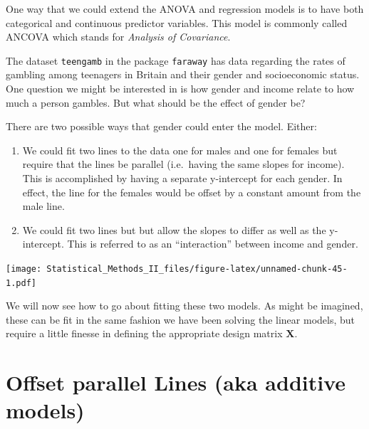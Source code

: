\documentclass[]{book}
\theoremstyle{definition}
\theoremstyle{definition}
\theoremstyle{remark}
\begin{document}
One way that we could extend the ANOVA and regression models is to have
both categorical and continuous predictor variables. This model is
commonly called ANCOVA which stands for \emph{Analysis of Covariance}.

The dataset \texttt{teengamb} in the package \texttt{faraway} has data
regarding the rates of gambling among teenagers in Britain and their
gender and socioeconomic status. One question we might be interested in
is how gender and income relate to how much a person gambles. But what
should be the effect of gender be?

There are two possible ways that gender could enter the model. Either:

\begin{enumerate}
\def\labelenumi{\arabic{enumi}.}
\item
  We could fit two lines to the data one for males and one for females
  but require that the lines be parallel (i.e.~having the same slopes
  for income). This is accomplished by having a separate y-intercept for
  each gender. In effect, the line for the females would be offset by a
  constant amount from the male line.
\item
  We could fit two lines but but allow the slopes to differ as well as
  the y-intercept. This is referred to as an ``interaction'' between
  income and gender.
\end{enumerate}

\texttt{[image: Statistical\_Methods\_II\_files/figure-latex/unnamed-chunk-45-1.pdf]}

We will now see how to go about fitting these two models. As might be
imagined, these can be fit in the same fashion we have been solving the
linear models, but require a little finesse in defining the appropriate
design matrix \(\boldsymbol{X}\).

\section{Offset parallel Lines (aka additive
models)}\label{offset-parallel-lines-aka-additive-models}
\end{document}
